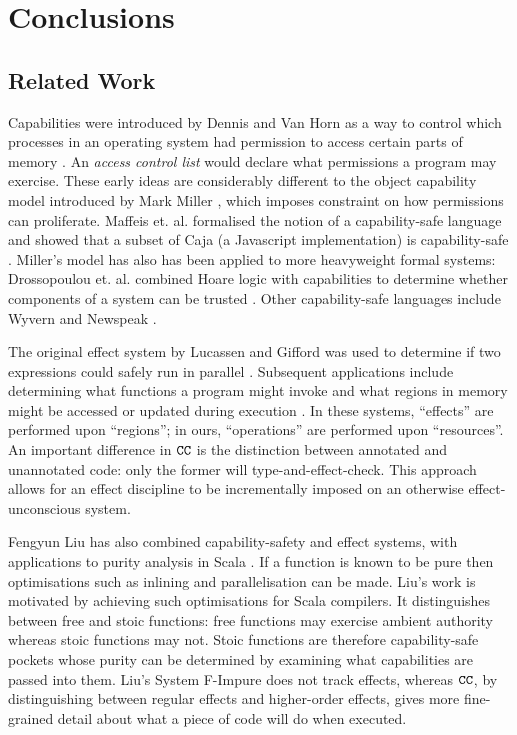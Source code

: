 
\chapter{Conclusions}

\section{Related Work}

Capabilities were introduced by Dennis and Van Horn as a way to control which processes in an operating system had permission to access certain parts of memory \cite{dennis66}. An \textit{access control list} would declare what permissions a program may exercise. These early ideas are considerably different to the object capability model introduced by Mark Miller \cite{miller06}, which imposes constraint on how permissions can proliferate. Maffeis et. al. formalised the notion of a capability-safe language and showed that a subset of Caja (a Javascript implementation) is capability-safe \cite{maffeis10}. Miller's model has also has been applied to more heavyweight formal systems: Drossopoulou et. al. combined Hoare logic with capabilities to determine whether components of a system can be trusted \cite{drossopoulou07}. Other capability-safe languages include Wyvern \cite{nistor13} and Newspeak \cite{bracha10}.

The original effect system by Lucassen and Gifford was used to determine if two expressions could safely run in parallel \cite{lucassen88}. Subsequent applications include determining what functions a program might invoke \cite{tang94} and what regions in memory might be accessed or updated during execution \cite{talpin94}. In these systems, ``effects'' are performed upon ``regions''; in ours, ``operations'' are performed upon ``resources''. An important difference in $\mathtt{CC}$ is the distinction between annotated and unannotated code: only the former will type-and-effect-check. This approach allows for an effect discipline to be incrementally imposed on an otherwise effect-unconscious system.

Fengyun Liu has also combined capability-safety and effect systems, with applications to purity analysis in Scala \cite{liu16}. If a function is known to be pure then optimisations such as inlining and parallelisation can be made. Liu's work is motivated by achieving such optimisations for Scala compilers. It distinguishes between free and stoic functions: free functions may exercise ambient authority whereas stoic functions may not. Stoic functions are therefore capability-safe pockets whose purity can be determined by examining what capabilities are passed into them. Liu's System F-Impure does not track effects, whereas $\mathtt{CC}$, by distinguishing between regular effects and higher-order effects, gives more fine-grained detail about what a piece of code will do when executed.


